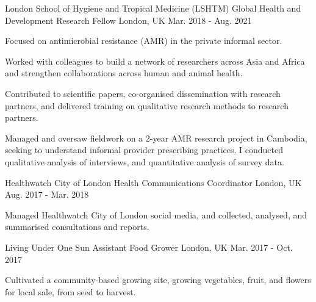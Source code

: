 \begin{cventries}
\vspace{-2ex}
\cventry
 {London School of Hygiene and Tropical Medicine (LSHTM)}
    {Global Health and Development Research Fellow}
    {London, UK}
    {Mar. 2018 - Aug. 2021}
    {
      \begin{cvitems}
       \item Focused on antimicrobial resistance (AMR) in the private informal sector. 
       \item Worked with colleagues to build a network of researchers across Asia and Africa and strengthen collaborations across human and animal health. 
        \item Contributed to scientific papers, co-organised dissemination with research partners, and delivered training on qualitative research methods to research partners. 
         \item Managed and oversaw fieldwork on a 2-year AMR research project in Cambodia, seeking to understand informal provider prescribing practices. I conducted qualitative analysis of interviews, and quantitative analysis of survey data.
      \end{cvitems}
    }   
 
\vspace{-2ex}  
\cventry
 {Healthwatch City of London}
   {Health Communications Coordinator}
   {London, UK}
    {Aug. 2017 - Mar. 2018}
    {
     \begin{cvitems}
       \item{Managed Healthwatch City of London social media, and collected, analysed, and summarised consultations and reports. }
      \end{cvitems}
    }


\vspace{-2ex}
    \cventry
{Living Under One Sun}
{Assistant Food Grower}
{London, UK}
{Mar. 2017 - Oct. 2017}
{
  \begin{cvitems}
    \item {Cultivated a community-based growing site, growing vegetables, fruit, and flowers for local sale, from seed to harvest.} 
  \end{cvitems}
}


\end{cventries}
